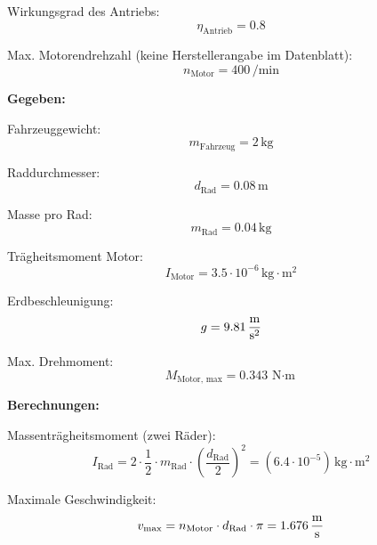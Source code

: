\documentclass[main.  tex]{subfiles} %
\begin{document}
\vspace{0.2cm}

Wirkungsgrad des Antriebs:
\[
    \eta_{\text{Antrieb}} = 0.8
\]

\vspace{0.2cm}

Max. Motorendrehzahl (keine Herstellerangabe im Datenblatt):
\[
    n_{\text{Motor}} = 400 \, \si{\per\minute}
\]

\vspace{0.5cm}

\textbf{Gegeben:}

\vspace{0.2cm}

Fahrzeuggewicht:
\[
    m_{\text{Fahrzeug}} = 2 \, \si{\kilogram}
\]

\vspace{0.2cm}

Raddurchmesser:
\[
    d_{\text{Rad}} = 0.08 \, \si{\meter}
\]

\vspace{0.2cm}

Masse pro Rad:
\[
    m_{\text{Rad}} = 0.04 \, \si{\kilogram}
\]

\vspace{0.2cm}

Trägheitsmoment Motor:
\[
    I_{\text{Motor}} = 3.5 \cdot 10^{-6} \, \si{\kilogram \cdot \meter\squared}
\]

\vspace{0.2cm}

Erdbeschleunigung:
\[
    g = 9.81 \, \si{\frac{\meter}{\second\squared}}
\]

\vspace{0.2cm}

Max. Drehmoment:
\[
    M_{\text{Motor, max}} = 0.343 \, \si{\newton \cdot \meter}
\]

\vspace{0.5cm}

\textbf{Berechnungen:}

\vspace{0.2cm}

Massenträgheitsmoment (zwei Räder):
\[
    I_{\text{Rad}} = 2 \cdot \frac{1}{2} \cdot m_{\text{Rad}} \cdot \left( \frac{d_{\text{Rad}}}{2} \right)^2 = (6.4 \cdot 10^{-5}) \, \si{\kilogram \cdot \meter\squared}
\]

\vspace{0.2cm}

Maximale Geschwindigkeit:
\[
    v_{\text{max}} = n_{\text{Motor}} \cdot d_{\text{Rad}} \cdot \pi = 1.676 \, \si{\frac{\meter}{\second}}
\]
\end{document}
